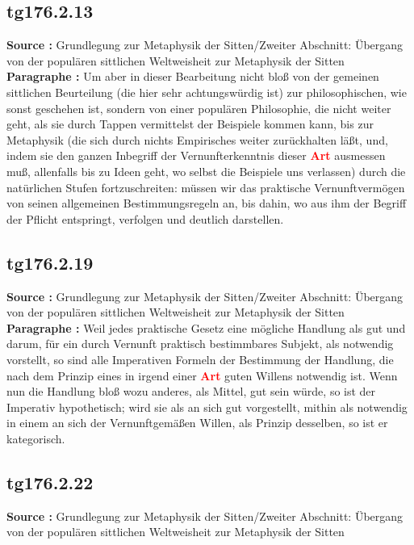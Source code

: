 \documentclass[a4paper,12pt,twoside]{book}
\newcommand{\match}[1]{\textcolor{red}{\textbf{#1}}}
\begin{document}
	\subsection*{tg176.2.13} 
	\textbf{Source : }Grundlegung zur Metaphysik der Sitten/Zweiter Abschnitt: Übergang von der populären sittlichen Weltweisheit zur Metaphysik der Sitten\\  
	
	\noindent\textbf{Paragraphe : }Um aber in dieser Bearbeitung nicht bloß von der gemeinen sittlichen Beurteilung (die hier sehr achtungswürdig ist) zur philosophischen, wie sonst geschehen ist, sondern von einer populären Philosophie, die nicht weiter geht, als  sie durch Tappen vermittelst der Beispiele kommen kann, bis zur Metaphysik (die sich durch nichts Empirisches weiter zurückhalten läßt, und, indem sie den ganzen Inbegriff der Vernunfterkenntnis dieser \match{Art} ausmessen muß, allenfalls bis zu Ideen geht, wo selbst die Beispiele uns verlassen) durch die natürlichen Stufen fortzuschreiten: müssen wir das praktische Vernunftvermögen von seinen allgemeinen Bestimmungsregeln an, bis dahin, wo aus ihm der Begriff der Pflicht entspringt, verfolgen und deutlich darstellen. 
	
	\subsection*{tg176.2.19} 
	\textbf{Source : }Grundlegung zur Metaphysik der Sitten/Zweiter Abschnitt: Übergang von der populären sittlichen Weltweisheit zur Metaphysik der Sitten\\  
	
	\noindent\textbf{Paragraphe : }Weil jedes praktische Gesetz eine mögliche Handlung als gut und darum, für ein durch Vernunft praktisch bestimmbares Subjekt, als notwendig vorstellt, so sind alle Imperativen Formeln der Bestimmung der Handlung, die nach dem Prinzip eines in irgend einer \match{Art} guten Willens notwendig ist. Wenn nun die Handlung bloß wozu anderes, als Mittel, gut sein würde, so ist der Imperativ hypothetisch; wird sie als an sich gut vorgestellt, mithin als notwendig in einem an sich der Vernunftgemäßen Willen, als Prinzip desselben, so ist er kategorisch. 
	
	\subsection*{tg176.2.22} 
	\textbf{Source : }Grundlegung zur Metaphysik der Sitten/Zweiter Abschnitt: Übergang von der populären sittlichen Weltweisheit zur Metaphysik der Sitten\\  
	
\end{document}
